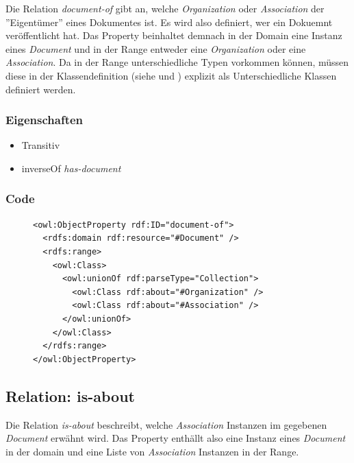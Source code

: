 \documentclass[
    11pt,
    latin1,
    a4paper,
    oneside
]{scrreprt}
\begin{document}
Die Relation \emph{document-of} gibt an, welche \emph{Organization} oder \emph{Association} der ''Eigent\"umer'' eines Dokumentes ist. Es wird also definiert, wer ein Dokuemnt ver\"offentlicht hat. Das Property beinhaltet demnach in der Domain eine Instanz eines \emph{Document} und in der Range entweder eine \emph{Organization} oder eine \emph{Association}. Da in der Range unterschiedliche Typen vorkommen k\"onnen, m\"ussen diese in der Klassendefinition (siehe  und ) explizit als Unterschiedliche Klassen definiert werden.

\subsubsection{Eigenschaften} \label{sec:rel_documentof_settings}

\begin{itemize}
  \item Transitiv
  \item inverseOf \emph{has-document}
\end{itemize}

\subsubsection{Code} \label{sec:rel_documentof_code}

\begin{figure}[H]
 \lstset{language=XML}
 \begin{lstlisting}[label=owl:documentof,caption={Die Relation \emph{document-of} gibt an, welche \emph{Organization} oder \emph{Association} das \emph{Document} ver\"offentlicht hat}]
<owl:ObjectProperty rdf:ID="document-of">
  <rdfs:domain rdf:resource="#Document" />
  <rdfs:range>
    <owl:Class>
      <owl:unionOf rdf:parseType="Collection">
        <owl:Class rdf:about="#Organization" />
        <owl:Class rdf:about="#Association" />
      </owl:unionOf>
    </owl:Class>
  </rdfs:range>
</owl:ObjectProperty>
 \end{lstlisting}
\end{figure}


\subsection{Relation: is-about} \label{sec:rel_isabout}

Die Relation \emph{is-about} beschreibt, welche \emph{Association} Instanzen im gegebenen \emph{Document} erw\"ahnt wird. Das Property enth\"allt also eine Instanz eines \emph{Document} in der domain und eine Liste von \emph{Association} Instanzen in der Range.
\end{document}

